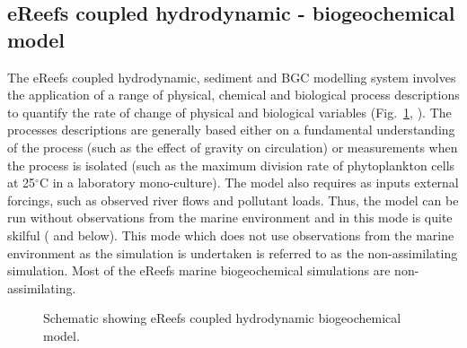 \subsection[eReefs coupled hydrodynamic]{eReefs coupled hydrodynamic - biogeochemical model}\label{sec:eReefs}

    
The eReefs coupled hydrodynamic, sediment and BGC modelling system involves the application of a
range of physical, chemical and biological process descriptions to quantify the rate of change of
physical and biological variables (Fig.~\ref{fig:bgc}, \citet{Schiller14}). The processes
descriptions are generally based either on a fundamental understanding of the process (such as the
effect of gravity on circulation) or measurements when the process is isolated (such as the maximum
division rate of phytoplankton cells at 25$^{\circ}$C in a laboratory mono-culture). The model also
requires as inputs external forcings, such as observed river flows and pollutant loads. Thus, the
model can be run without observations from the marine environment and in this mode is quite skilful
(\citet{Skerratt18} and below). This mode which does not use observations from the marine
environment as the simulation is undertaken is referred to as the non-assimilating simulation. Most
of the eReefs marine biogeochemical simulations are non-assimilating.

\begin{figure}[thb]
\begin{center}
\caption{Schematic showing eReefs coupled hydrodynamic biogeochemical model.}
\label{fig:bgc}
\end{center}
\end{figure}

